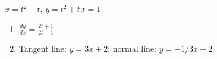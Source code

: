 {$x=t^2-t$, $y=t^2+t$;\quad $t=1$}
{\begin{enumerate}
	\item $\frac{dy}{dx} = \frac{2 t+1}{2 t-1}$
	\item	Tangent line: $y= 3x+2$; normal line: $y = -1/3x+2$
\end{enumerate}
}
